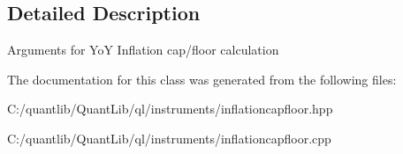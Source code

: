 \subsection{Detailed Description}
Arguments for YoY Inflation cap/floor calculation 

The documentation for this class was generated from the following files\+:\begin{DoxyCompactItemize}
\item 
C\+:/quantlib/\+Quant\+Lib/ql/instruments/inflationcapfloor.\+hpp\item 
C\+:/quantlib/\+Quant\+Lib/ql/instruments/inflationcapfloor.\+cpp\end{DoxyCompactItemize}
